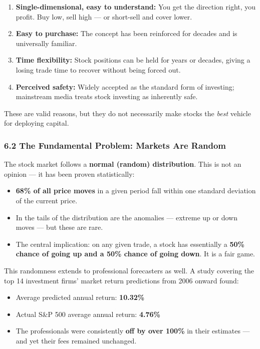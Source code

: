 \documentclass[12pt,openany]{book}
\begin{document}
\begin{enumerate}[leftmargin=*]
    \item \textbf{Single-dimensional, easy to understand:} You get the direction right, you profit. Buy low, sell high — or short-sell and cover lower.
    \item \textbf{Easy to purchase:} The concept has been reinforced for decades and is universally familiar.
    \item \textbf{Time flexibility:} Stock positions can be held for years or decades, giving a losing trade time to recover without being forced out.
    \item \textbf{Perceived safety:} Widely accepted as the standard form of investing; mainstream media treats stock investing as inherently safe.
\end{enumerate}

These are valid reasons, but they do not necessarily make stocks the \emph{best} vehicle for deploying capital.

\subsubsection{6.2 The Fundamental Problem: Markets Are Random}

The stock market follows a \textbf{normal (random) distribution}. This is not an opinion — it has been proven statistically:

\begin{itemize}[leftmargin=*]
    \item \textbf{68\% of all price moves} in a given period fall within one standard deviation of the current price.
    \item In the tails of the distribution are the anomalies — extreme up or down moves — but these are rare.
    \item The central implication: on any given trade, a stock has essentially a \textbf{50\% chance of going up and a 50\% chance of going down}. It is a fair game.
\end{itemize}

This randomness extends to professional forecasters as well. A study covering the top 14 investment firms' market return predictions from 2006 onward found:

\begin{itemize}[leftmargin=*]
    \item Average predicted annual return: \textbf{10.32\%}
    \item Actual S\&P 500 average annual return: \textbf{4.76\%}
    \item The professionals were consistently \textbf{off by over 100\%} in their estimates — and yet their fees remained unchanged.
\end{itemize}
\end{document}
